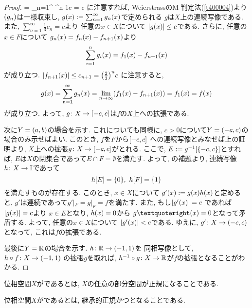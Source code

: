 \documentclass[uplatex, dvipdfmx, a4paper, 12pt, class=jsbook, crop=false]{standalone}
\begin{document}
\begin{proof}
	= \sum_{n=1}^{\infty} ^{n-1}c = c \)
	に注意すれば, WeierstrassのM-判定法(\cref{t400004})より
	\( \lrparen{g_n} \)は一様収束し,
	\( \mappt{g}{x} \defeq \sum_{n=1}^{\infty}\mappt{g_n}{x} \)で定められる
	\( g \)は\( X \)上の連続写像である.
	また, \( \sum_{n=1}^{\infty} \frac{1}{3}c_n = c \)より
	任意の\( x \in X \)について
	\( \abs{\mappt{g}{x}} \leq c \)である.
	さらに, 任意の\( x \in F \)について
	\( \mappt{g_{n}}{x} = \mappt{f_n}{x} - \mappt{f_{n+1}}{x} \)より
	\[ \sum_{i=1}^{n} \mappt{g_i}{x} = \mappt{f_1}{x} - \mappt{f_{n+1}}{x} \]
	が成り立つ.
	\( \abs{\mappt{f_{n+1}}{x}} \leq c_{n+1}
	= \lrparen{\frac{2}{3}}^{n} c \)
	に注意すると,
	\[ \mappt{g}{x} = \sum_{n=1}^{\infty} \mappt{g_n}{x}
	= \lim_{n \to \infty} \lrparen{\mappt{f_1}{x}
	- \mappt{f_{n+1}}{x}} = \mappt{f_1}{x} = \mappt{f}{x} \]
	が成り立つ.
	よって, \( g\colon X\to\left[ -c , c \right] \)は\( f \)の\( X \)上への拡張である.

	次に\( Y = \left( a , b \right) \)の場合を示す.
	これについても同様に,
	\( c > 0 \)について\( Y = \left( -c , c \right) \)の場合のみ示せばよい.
	このとき, \( f \)を\( F \)から\( \left[ -c , c \right] \)
	への連続写像とみなせば上の証明より,
	\( X \)上への拡張\( g\colon X\to\left[ -c , c \right] \)がとれる.
	ここで, \( E \defeq \mapinvset{g}{\lrbrace{-c,c}} \)とすれば,
	\( E \)は\( X \)の閉集合であって\( E \cap F = \emptyset \)を満たす.
	よって, \Urysohn の補題より,
	連続写像\( h\colon X\to\mathbb{I} \)であって
	\[ \mapset{h}{E} = \lrbrace{0}, \ \mapset{h}{F} = \lrbrace{1} \]
	を満たすものが存在する.
	このとき, \( x \in X \)について
	\( \mappt{g'}{x} \defeq \mappt{g}{x}\mappt{h}{x} \)と定めると,
	\( g' \)は連続であって\( g'|_F = g|_F = f \)を満たす.
	また, もし\( \abs{\mappt{g'}{x}} = c \)
	であれば\( \abs{\mappt{g}{x}} = c \)より
	\( x \in E \)となり, \( \mappt{h}{x} = 0 \)から
	\( \mappt{g’}{x} = 0 \)となって矛盾する.
	よって, 任意の\( x \in X \)について
	\( \abs{\mappt{g'}{x}} < c \)である.
	ゆえに, \( g'\colon X\to\left( -c , c \right) \)となって,
	これは\( f \)の拡張である.

	最後に\( Y = \mathbb{R} \)の場合を示す.
	\( h\colon\mathbb{R}\to\left( -1 , 1 \right) \)を
	同相写像として, \( h\circ f\colon X\to\left( -1 , 1 \right) \)
	の拡張\( g \)を取れば,
	\( h^{-1}\circ g\colon X\to\mathbb{R} \)が\( f \)の拡張となることがわかる.
\end{proof}


\begin{definition}
	位相空間$ X $がであるとは, $ X $の任意の部分空間が正規になることである.
\end{definition}

\begin{definition}
	位相空間$ X $がであるとは, 継承的正規かつとなることである.
\end{definition}
\end{document}
